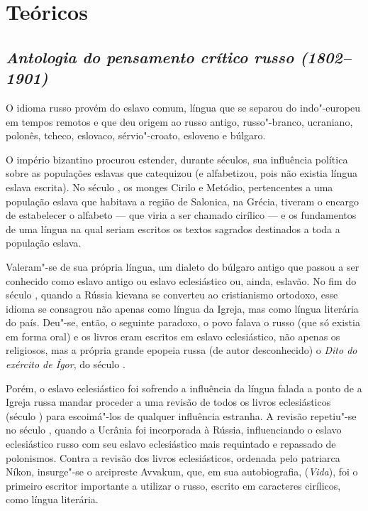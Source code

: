 {\part{Teóricos}

\chapter{\emph{Antologia do pensamento crítico russo (1802--1901)}}

O idioma russo provém do eslavo comum, língua que se separou do
indo"-europeu em tempos remotos e que deu origem ao russo antigo,
russo"-branco, ucraniano, polonês, tcheco, eslovaco, sérvio"-croato,
esloveno e búlgaro.

O império bizantino procurou estender, durante séculos, sua influência
política sobre as populações eslavas que catequizou (e alfabetizou, pois
não existia língua eslava escrita). No século , os monges Cirilo e
Metódio, pertencentes a uma população eslava que habitava a região de
Salonica, na Grécia, tiveram o encargo de estabelecer o alfabeto --- que
viria a ser chamado cirílico --- e os fundamentos de uma língua na qual
seriam escritos os textos sagrados destinados a toda a população eslava.

Valeram"-se de sua própria língua, um dialeto do búlgaro antigo que
passou a ser conhecido como eslavo antigo ou eslavo eclesiástico ou,
ainda, eslavão. No fim do século , quando a Rússia kievana se
converteu ao cristianismo ortodoxo, esse idioma se consagrou não apenas
como língua da Igreja, mas como língua literária do país. Deu"-se, então,
o seguinte paradoxo, o povo falava o russo (que só existia em forma
oral) e os livros eram
escritos em eslavo eclesiástico, não apenas os religiosos, mas a própria
grande epopeia russa (de autor desconhecido) o \emph{Dito do exército de
Ígor}, do século .

Porém, o eslavo eclesiástico foi sofrendo a influência da língua falada
a ponto de a Igreja russa mandar proceder a uma revisão de todos os
livros eclesiásticos (século ) para escoimá"-los de qualquer
influência estranha. A revisão repetiu"-se no século , quando a
Ucrânia foi incorporada à Rússia, influenciando o eslavo eclesiástico
russo com seu eslavo eclesiástico mais requintado e repassado de
polonismos. Contra a revisão dos livros eclesiásticos, ordenada pelo
patriarca Níkon, insurge"-se o arcipreste Avvakum, que, em sua
autobiografia, (\emph{Vida}), foi o primeiro escritor importante a
utilizar o russo, escrito em caracteres cirílicos, como língua literária.

}
